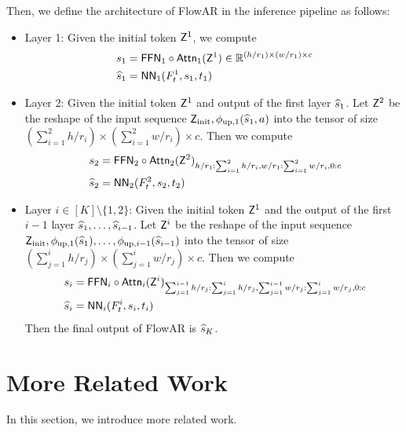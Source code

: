 \begin{definition}
    Then, we define the architecture of FlowAR in the inference pipeline as follows:
    \begin{itemize}
        \item Layer 1: Given the initial token $\mathsf{Z}^1$, we compute
        \begin{align*}
            &~ s_1 = \mathsf{FFN}_1 \circ \mathsf{Attn}_1 (\mathsf{Z}^1) \in \mathbb{R}^{(h/r_1) \times (w/r_1) \times c}\\
            &~ \widehat{s}_1 = \mathsf{NN}_1(F_t^1,s_1,t_1)
        \end{align*}
        \item Layer 2: Given the initial token $\mathsf{Z}^1$ and output of the first layer $\widehat{s}_1$. Let $\mathsf{Z}^2$ be the reshape of the input sequence $\mathsf{Z}_{\mathrm{init}}, \phi_{\mathrm{up},1}(\widehat{s}_1,a)$ into the tensor of size $(\sum_{i=1}^2 h/r_i) \times (\sum_{i=1}^2 w/r_i) \times c$. Then we compute
        \begin{align*}
            &~ s_2 = \mathsf{FFN}_2 \circ \mathsf{Attn}_2 (\mathsf{Z}^2)_{h/r_1:\sum_{i=1}^2 h/r_i,w/r_1 :\sum_{i=1}^2 w/r_i,0:c}\\
            &~ \widehat{s}_2 = \mathsf{NN}_2(F_t^2,s_2,t_2)
        \end{align*}
        \item  Layer  $i \in [K]\setminus \{1,2\}$: Given the initial token $\mathsf{Z}^1$ and the output of the first $i-1$ layer $\widehat{s}_1,\dots,\widehat{s}_{i-1}$. Let $\mathsf{Z}^i$ be the reshape of the input sequence $\mathsf{Z}_{\mathrm{init}}, \phi_{\mathrm{up},1}(\widehat{s}_1), \dots, \phi_{\mathrm{up},i-1}(\widehat{s}_{i-1})$ into the tensor of size $(\sum_{j=1}^i h/r_j) \times (\sum_{j=1}^i w/r_j) \times c$. Then we compute
        \begin{align*}
            &~ s_i = \mathsf{FFN}_i \circ \mathsf{Attn}_i (\mathsf{Z}^i)_{\sum_{j=1}^{i-1} h/r_j : \sum_{j=1}^i h/r_j , \sum_{j=1}^{i-1} w/r_j : \sum_{j=1}^i w/r_j,0:c}\\
            &~ \widehat{s}_i = \mathsf{NN}_i(F_t^i,s_i,t_i)
        \end{align*}
        Then the final output of FlowAR is $\widehat{s}_K$.
    \end{itemize}
\end{definition}

\section{More Related Work}\label{sec:more_work}
In this section, we introduce more related work. 

